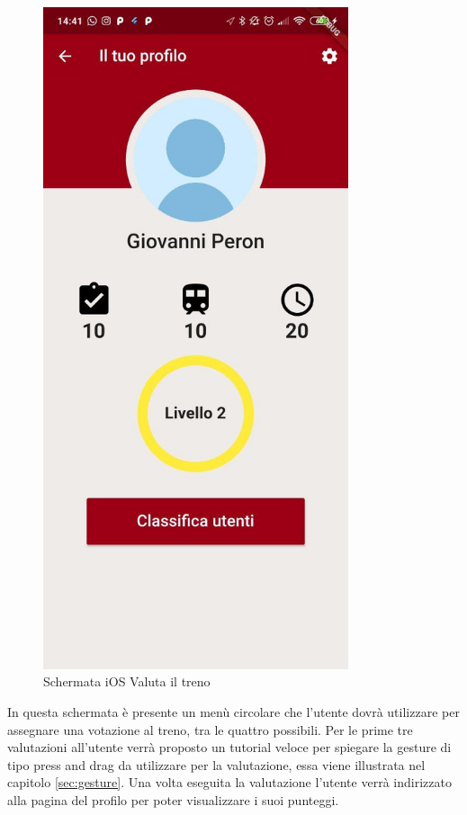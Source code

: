 \begin{minipage}{0.45\textwidth}
	\begin{figure}[H]
		\centering
		\includegraphics[width=0.8\textwidth]{immagini/profile.jpg}
		\caption{Schermata iOS Valuta il treno}
	\end{figure}
\end{minipage}

In questa schermata è presente un menù circolare che l'utente dovrà utilizzare per assegnare una votazione al treno, tra le quattro possibili.
Per le prime tre valutazioni all'utente verrà proposto un tutorial veloce per spiegare la gesture di tipo press and drag da utilizzare per la valutazione, essa viene illustrata nel capitolo \ref{sec:gesture}. Una volta eseguita la valutazione l'utente verrà indirizzato alla pagina del profilo per poter visualizzare i suoi punteggi.

